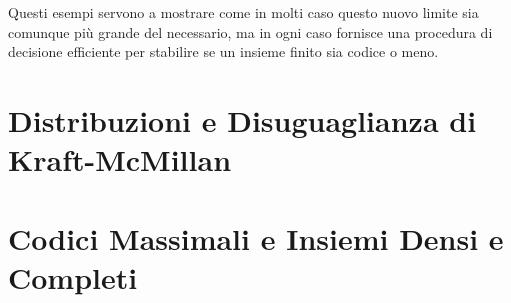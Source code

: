 Questi esempi servono a mostrare come in molti caso questo nuovo limite sia comunque più grande del necessario, ma in ogni caso fornisce una procedura di decisione efficiente per stabilire se un insieme finito sia codice o meno.

\section{Distribuzioni e Disuguaglianza di Kraft-McMillan}

\section{Codici Massimali e Insiemi Densi e Completi}

